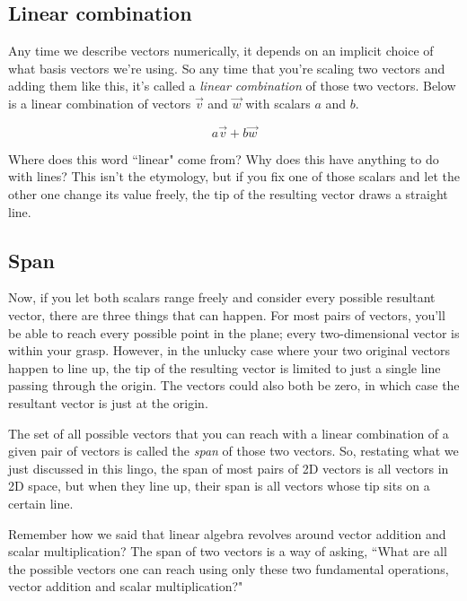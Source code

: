 \subsection{Linear combination}

Any time we describe vectors numerically, it depends on an implicit choice of
what basis vectors we're using. So any time that you're scaling two vectors and
adding them like this, it's called a \textit{linear combination} of those two
vectors. Below is a linear combination of vectors $\vec{v}$ and $\vec{w}$ with
scalars $a$ and $b$.

\begin{equation*}
  a \vec{v} + b \vec{w}
\end{equation*}

Where does this word ``linear" come from? Why does this have anything to do with
lines? This isn't the etymology, but if you fix one of those scalars and let the
other one change its value freely, the tip of the resulting vector draws a
straight line.

\subsection{Span}

Now, if you let both scalars range freely and consider every possible resultant
vector, there are three things that can happen. For most pairs of vectors,
you'll be able to reach every possible point in the plane; every two-dimensional
vector is within your grasp. However, in the unlucky case where your two original
vectors happen to line up, the tip of the resulting vector is limited to just a
single line passing through the origin. The vectors could also both be zero, in
which case the resultant vector is just at the origin.

The set of all possible vectors that you can reach with a linear combination of
a given pair of vectors is called the \textit{span} of those two vectors. So,
restating what we just discussed in this lingo, the span of most pairs of 2D
vectors is all vectors in 2D space, but when they line up, their span is all
vectors whose tip sits on a certain line.

Remember how we said that linear algebra revolves around vector addition and
scalar multiplication? The span of two vectors is a way of asking, ``What are
all the possible vectors one can reach using only these two fundamental
operations, vector addition and scalar multiplication?"

